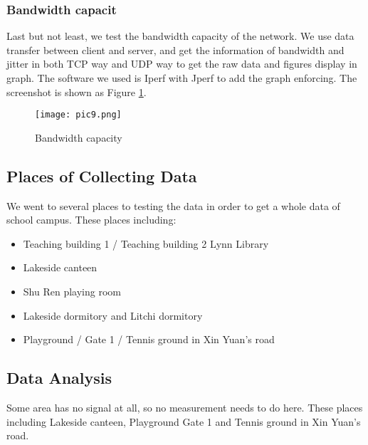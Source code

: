 \documentclass[paper=a4, fontsize=11pt]{scrartcl}
\numberwithin{equation}{section}
\numberwithin{figure}{section}
\numberwithin{table}{section}
\begin{document}
\subsubsection{Bandwidth capacit}
Last but not least, we test the bandwidth capacity of the network. We use data transfer between client and server, and get the information of bandwidth and jitter in both TCP way and UDP way to get the raw data and figures display in graph. The software we used is Iperf with Jperf to add the graph enforcing. The screenshot is shown as Figure \ref{fig9}.
\begin{figure}[!htb]
\centering
\texttt{[image: pic9.png]}
\caption{Bandwidth capacity}
\label{fig9}
\end{figure}
\subsection{Places of Collecting Data}
We went to several places to testing the data in order to get a whole data of school campus. These places including:
\begin{itemize}
\item Teaching building 1 / Teaching building 2 Lynn Library
\item Lakeside canteen
\item Shu Ren playing room
\item Lakeside dormitory and Litchi dormitory
\item Playground / Gate 1 / Tennis ground in Xin Yuan's road
\end{itemize}
\subsection{Data Analysis}
Some area has no signal at all, so no measurement needs to do here. These places including Lakeside canteen, Playground Gate 1 and Tennis ground in Xin Yuan's road.
\end{document}
